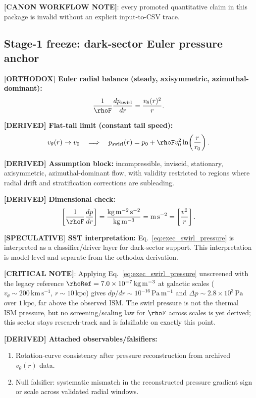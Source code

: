 \textbf{[CANON WORKFLOW NOTE]}: every promoted quantitative claim in this package is invalid without an explicit input-to-CSV trace.

\subsection{Stage-1 freeze: dark-sector Euler pressure anchor}
\textbf{[ORTHODOX] Euler radial balance (steady, axisymmetric, azimuthal-dominant):}
\begin{align}
    \frac{1}{\rhoF}\frac{dp_{\mathrm{swirl}}}{dr}
    =
    \frac{v_\theta(r)^2}{r}.
    \label{eq:exec_swirl_pressure}
\end{align}

\textbf{[DERIVED] Flat-tail limit (constant tail speed):}
\begin{align}
    v_\theta(r)\to v_0
    \quad\Longrightarrow\quad
    p_{\mathrm{swirl}}(r)
    =
    p_0 + \rhoF v_0^2\ln\!\left(\frac{r}{r_0}\right).
\end{align}

\textbf{[DERIVED] Assumption block:}
incompressible, inviscid, stationary, axisymmetric, azimuthal-dominant flow, with validity restricted to regions where radial drift and stratification corrections are subleading.

\textbf{[DERIVED] Dimensional check:}
\[
\left[\frac{1}{\rhoF}\frac{dp}{dr}\right]
=
\frac{\mathrm{kg\,m^{-2}\,s^{-2}}}{\mathrm{kg\,m^{-3}}}
=
\mathrm{m\,s^{-2}}
=
\left[\frac{v^2}{r}\right].
\]

\textbf{[SPECULATIVE] SST interpretation:}
Eq.~\eqref{eq:exec_swirl_pressure} is interpreted as a classifier/driver layer for dark-sector support. This interpretation is model-level and separate from the orthodox derivation.

\textbf{[CRITICAL NOTE]}: Applying Eq.~\eqref{eq:exec_swirl_pressure} unscreened with the legacy reference $\rhoRef=7.0\times10^{-7}\,\mathrm{kg\,m^{-3}}$ at galactic scales ($v_\theta\sim200\,\mathrm{km\,s^{-1}}$, $r\sim10\,\mathrm{kpc}$) gives $dp/dr\sim10^{-16}\,\mathrm{Pa\,m^{-1}}$ and $\Delta p\sim2.8\times10^{3}\,\mathrm{Pa}$ over $1\,\mathrm{kpc}$, far above the observed ISM. The swirl pressure is not the thermal ISM pressure, but no screening/scaling law for $\rhoF$ across scales is yet derived; this sector stays research-track and is falsifiable on exactly this point.

\textbf{[DERIVED] Attached observables/falsifiers:}
\begin{enumerate}
    \item Rotation-curve consistency after pressure reconstruction from archived $v_\theta(r)$ data.
    \item Null falsifier: systematic mismatch in the reconstructed pressure gradient sign or scale across validated radial windows.
\end{enumerate}

